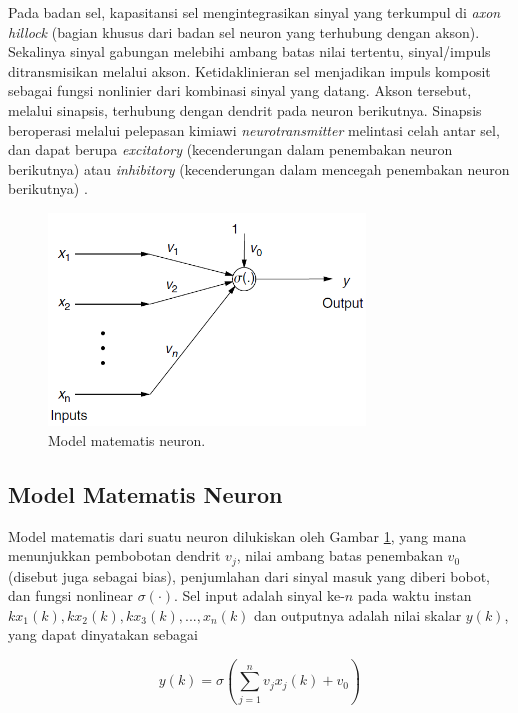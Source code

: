 Pada badan sel, kapasitansi sel mengintegrasikan sinyal yang terkumpul di \textit{axon hillock} (bagian khusus dari badan sel neuron yang terhubung dengan akson). Sekalinya sinyal gabungan melebihi ambang batas nilai tertentu, sinyal/impuls ditransmisikan melalui akson. Ketidaklinieran sel menjadikan impuls komposit sebagai fungsi nonlinier dari kombinasi sinyal yang datang. Akson tersebut, melalui sinapsis, terhubung dengan dendrit pada neuron berikutnya. Sinapsis beroperasi melalui pelepasan kimiawi \textit{neurotransmitter} melintasi celah antar sel, dan dapat berupa \textit{excitatory} (kecenderungan dalam penembakan neuron berikutnya) atau \textit{inhibitory} (kecenderungan dalam mencegah penembakan neuron berikutnya) \cite{NNControlBook}.

\begin{figure}[!h]
	\centering
	\includegraphics[width=0.75\textwidth]{figures/neuronmath}
	\caption{Model matematis neuron.}
	\label{fig:3:math}
\end{figure}

\subsection{Model Matematis Neuron}

Model matematis dari suatu neuron dilukiskan oleh Gambar \ref{fig:3:math}, yang mana menunjukkan pembobotan dendrit $v_j$, nilai ambang batas penembakan $v_0$ (disebut juga sebagai bias), penjumlahan dari sinyal masuk yang diberi bobot, dan fungsi nonlinear $\sigma(\cdot)$. Sel input adalah sinyal ke-$n$ pada waktu instan 	$kx_1(k), kx_2(k), kx_3(k),...,x_n(k)$ dan outputnya adalah nilai skalar $y(k)$, yang dapat dinyatakan sebagai

\begin{equation} \label{eq:3:perceptron}
y(k) = \sigma \left( \sum_{j=1}^{n}v_jx_j(k)+v_0 \right)
\end{equation}

